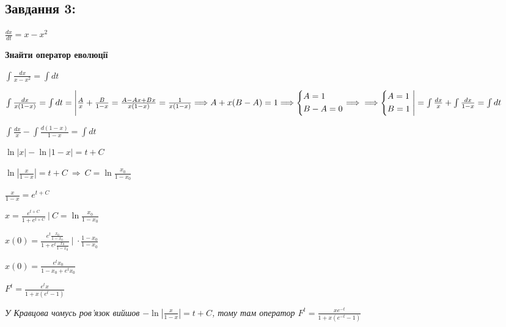 \subsection{Завдання 3:}

$\frac{dx}{dt} = x - x^2$

\textbf{Знайти оператор еволюції}

$\int \frac{dx}{x - x^2} = \int dt$

$\int \frac{dx}{x(1-x)} = \int dt = \Bigg{|}\frac{A}{x} + \frac{B}{1-x} = \frac{A - Ax + Bx}{x(1-x)} = \frac{1}{x(1-x)}
\Longrightarrow A +x(B-A) = 1\Longrightarrow \left\{\begin{aligned}
    &A = 1\\
    &B-A = 0
\end{aligned}\right. \Longrightarrow \\\Longrightarrow \left\{\begin{aligned}
    &A = 1\\
    &B = 1
\end{aligned}\right. \Bigg{|} = \int \frac{dx}{x} + \int \frac{dx}{1-x} = \int dt$

$\int \frac{dx}{x} - \int \frac{d(1-x)}{1-x} = \int dt$

$\ln|x| - \ln |1-x| = t +C$

$\ln |\frac{x}{1-x}| = t + C \ \Longrightarrow\ C = \ln \frac{x_0}{1-x_0}$

$\frac{x}{1-x} = e^{t+C}$

$x = \frac{e^{t+C}}{1+e^{t +C}} \ | \ C = \ln \frac{x_0}{1-x_0}$

$x(0) = \frac{e^t\frac{x_0}{1-x_0}}{1+e^t\frac{x_0}{1-x_0}} \ |\ \cdot \frac{1-x_0}{1-x_0}$

$x(0) = \frac{e^tx_0}{1-x_0 + e^tx_0}$

$F^t = \frac{e^tx}{1+x(e^t- 1)}$

\textit{У Кравцова чомусь ров'язок вийшов $-\ln |\frac{x}{1-x}| = t +C$, тому там оператор 
$F^t = \frac{xe^{-t}}{1+x(e^{-t} - 1 )}$}
